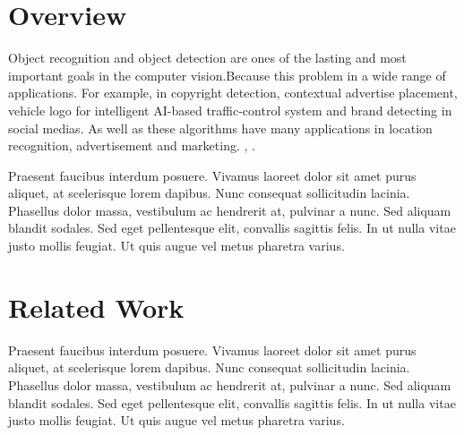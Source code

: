 \section{Overview} \label{sec:1.1}
\vspace{-0.5cm}
\noindent Object recognition and object detection are ones of the lasting and most important goals in the computer vision.Because this problem in a wide range of applications. For example, in copyright detection, contextual advertise placement, vehicle logo for intelligent AI-based traffic-control system and brand detecting in social medias. As well as these algorithms have many applications in location recognition, advertisement and marketing. \cite{Haykins}, \cite{Hayes}.

\vspace{-0.5cm}
\par
\noindent Praesent faucibus interdum posuere. Vivamus laoreet dolor sit amet purus aliquet, at scelerisque lorem dapibus. Nunc consequat sollicitudin lacinia. Phasellus dolor massa, vestibulum ac hendrerit at, pulvinar a nunc. Sed aliquam blandit sodales. Sed eget pellentesque elit, convallis sagittis felis. In ut nulla vitae justo mollis feugiat. Ut quis augue vel metus pharetra varius.

\vspace{-0.3cm}
\section{Related Work}\label{sec:1.2}
\vspace{-0.6cm}
\noindent Praesent faucibus interdum posuere. Vivamus laoreet dolor sit amet purus aliquet, at scelerisque lorem dapibus. Nunc consequat sollicitudin lacinia. Phasellus dolor massa, vestibulum ac hendrerit at, pulvinar a nunc. Sed aliquam blandit sodales. Sed eget pellentesque elit, convallis sagittis felis. In ut nulla vitae justo mollis feugiat. Ut quis augue vel metus pharetra varius.



\vspace{-0.3cm}
